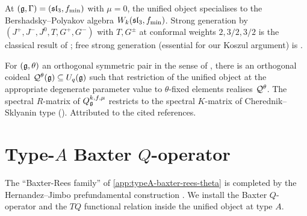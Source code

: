 \begin{proposition}
\label{prop:fibre-bp}
\ClaimStatusProvedHere
At $(\mathfrak{g}, \Gamma) = (\mathfrak{sl}_3, f_{\mathrm{min}})$ with $\mu = 0$, the
unified object specialises to the Bershadsky--Polyakov algebra
$W_k(\mathfrak{sl}_3, f_{\mathrm{min}})$. Strong generation by
$(J^+, J^-, J^0, T, G^+, G^-)$ with $T, G^{\pm}$ at conformal weights
$2, 3/2, 3/2$ is the classical result of
\cite{Bershadsky91,Polyakov90}; free strong generation (essential for
our Koszul argument) is \cite{deBoerTjin93}.
\end{proposition}

\begin{proposition}
\label{prop:fibre-coideal}
\ClaimStatusProvedElsewhere
For $(\mathfrak{g}, \theta)$ an orthogonal symmetric pair in the sense of
\cite{LetzterG03,Kolb14}, there is an orthogonal coideal
$\mathcal{Q}^{\theta}(\mathfrak{g})\subseteq U_{q}(\mathfrak{g})$ such that restriction of the
unified object at the appropriate degenerate parameter value to
$\theta$-fixed elements realises $\mathcal{Q}^{\theta}$. The spectral
$R$-matrix of $Q_{\mathfrak{g}}^{k,f,\mu}$ restricts to the spectral
$K$-matrix of Cherednik--Sklyanin type (\cite{RegelskisVlaar16}).
Attributed to the cited references.
\end{proposition}

\section{Type-$A$ Baxter $Q$-operator}
\label{sec:typeA-baxter}

The ``Baxter-Rees family'' of \cref{app:typeA-baxter-rees-theta} is
completed by the Hernandez--Jimbo prefundamental construction
\cite{HernandezJimbo12,FrenkelHernandez15}. We install the Baxter
$Q$-operator and the $TQ$ functional relation inside the unified
object at type $A$.

